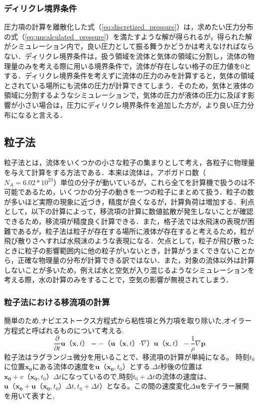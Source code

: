 \documentclass[a4j,12pt]{jreport}
\begin{document}
\subsubsection{ディリクレ境界条件} \label{subsec:Dirichlet}
圧力項の計算を離散化した式（\ref{eq:discretized_pressure}）は，求めたい圧力分布の式（\ref{eq:uncalculated_pressure}）を満たすような解が得られるが，得られた解がシミュレーション内で，良い圧力として振る舞うかどうかは考えなければならない．ディリクレ境界条件は，扱う領域を流体と気体の領域に分割し，流体の物理量のみを考える際に用いる境界条件で，流体が存在しない格子の圧力値を$0$とする．ディリクレ境界条件を考えずに流体の圧力のみを計算すると，気体の領域とされている場所にも流体の圧力が計算できてしまう．そのため，気体と液体の領域に分割するようなシミュレーションで，気体の圧力が液体の圧力に及ぼす影響が小さい場合は，圧力にディリクレ境界条件を追加した方が，より良い圧力分布になると言える．

\subsection{粒子法} \label{subsec:particle}
粒子法とは，流体をいくつかの小さな粒子の集まりとして考え，各粒子に物理量を与えて計算をする方法である．本来は流体は，アボガドロ数（$N_A = 6.02*10^{23}$）単位の分子が動いているが，これら全てを計算機で扱うのは不可能であるため，いくつかの分子の動きを一つの粒子にまとめて扱う．粒子の数が多いほど実際の現象に近づき，精度が良くなるが，計算負荷は増加する．利点として，以下の計算によって，移流項の計算に数値拡散が発生しないことが確認できるため，移流項が精度良く計算できる．また，格子法では水飛沫の表現が困難であるが，粒子法は粒子が存在する場所に液体が存在すると考えるため，粒が飛び散りさへすれば水飛沫のような表現になる．欠点として，粒子が飛び散ったときに粒子の影響範囲内に他の粒子がいないとき，計算がうまくできないことから，正確な物理量の分布が計算できる訳ではない．また，対象の流体以外は計算しないことが多いため，例えば水と空気が入り混じるようなシミュレーションを考える際，水の計算のみをすることで，空気の影響が無視されてしまう．
\subsubsection{粒子法における移流項の計算} \label{subsec:particleadvect}
簡単のため,ナビエストークス方程式から粘性項と外力項を取り除いた,オイラー方程式と呼ばれるものについて考える.
$$\frac{\partial}{\partial t}\bm{u}（\bm{x},t） = -（\bm{u}（\bm{x},t）\boldsymbol{\cdot}\nabla）\bm{u}（\bm{x},t） - \frac{1}{\rho}\nabla \bm{p}$$
粒子法はラグランジュ微分を用いることで、移流項の計算が単純になる。
時刻$t_0$に位置$\bm{x_0}$にある流体の速度を$\bm{u}（\bm{x_0},t_0）$とする.$\varDelta t$秒後の位置は$\bm{x_0}+v（\bm{x_0},t_0）\varDelta t$になっているので,時刻$t_0+\varDelta t$の流体の速度は、$\bm{u}（\bm{x_0}+\bm{u}（\bm{x_0},t_0）\varDelta t,t_0+\varDelta t）$となる。この間の速度変化$\varDelta \bm{u}$をテイラー展開を用いて表すと,
\end{document}
